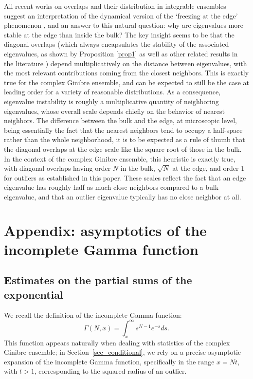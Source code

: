 \documentclass[12pt,a4paper]{amsart}
\theoremstyle{plain} %
\begin{document}
All recent works on overlaps and their distribution in integrable ensembles suggest an interpretation of the dynamical version of the `freezing at the edge' phenomenon \cite{FreezingEdge}, and an answer to this natural question: why are eigenvalues more stable at the edge than inside the bulk? The key insight seems to be that the diagonal overlaps (which always encapsulates the stability of the associated eigenvalues, as shown by Proposition \ref{prop1} as well as other related results in the literature \cites{BourgadeDubach,GrelaWarchol,ChalkerMehlig}) depend multiplicatively on the distance between eigenvalues, with the most relevant contributions coming from the closest neighbors. This is exactly true for the complex Ginibre ensemble, and can be expected to still be the case at leading order for a variety of reasonable distributions. As a consequence, eigenvalue instability is roughly a multiplicative quantity of neighboring eigenvalues, whose overall scale depends chiefly on the behavior of nearest neighbors. The difference between the bulk and the edge, at microscopic level, being essentially the fact that the nearest neighbors tend to occupy a half-space rather than the whole neighborhood, it is to be expected as a rule of thumb that the diagonal overlaps at the edge scale like the square root of those in the bulk. In the context of the complex Ginibre ensemble, this heuristic is exactly true, with diagonal overlaps having order $N$ in the bulk, $\sqrt{N}$ at the edge, and order $1$ for outliers as established in this paper. These scales reflect the fact that an edge eigenvalue has roughly half as much close neighbors compared to a bulk eigenvalue, and that an outlier eigenvalue typically has no close neighbor at all. 

\newpage
\section{Appendix: asymptotics of the incomplete Gamma function}\label{appendix}

\subsection{Estimates on the partial sums of the exponential}\label{appendix_A}

We recall the definition of the incomplete Gamma function:
$$\Gamma(N, x) = \int_{x}^{\infty} s^{N-1} e^{-s} ds.$$
This function appears naturally when dealing with statistics of the complex Ginibre ensemble; in Section~\ref{sec_conditional}, we rely on a precise asymptotic expansion of the incomplete Gamma function, specifically in the range $x = Nt$, with $t>1$, corresponding to the squared radius of an outlier.
\end{document}

